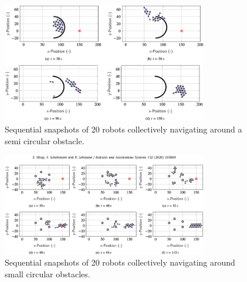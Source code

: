 \documentclass[conference]{IEEEtran}
\begin{document}
\begin{figure}[htbp]
    \centering
    \includegraphics[width=0.8\textwidth]{Pictures/Sequential snapshots of 20 robots collectively navigating around a semi circular obstacle.png}
    \caption{Sequential snapshots of 20 robots collectively navigating around a semi circular obstacle.}
    \label{fig:Sequential snapshots of 20 robots collectively navigating around a semi circular obstacle}
\end{figure}
\begin{figure}[htbp]
    \centering
    \includegraphics[width=0.8\textwidth]{Pictures/Sequential snapshots of 20 robots collectively navigating around small circular obstacles.png}
    \caption{Sequential snapshots of 20 robots collectively navigating around small circular obstacles.}
    \label{fig:Sequential snapshots of 20 robots collectively navigating around small circular obstacles}
\end{figure}

\clearpage


\end{document}
